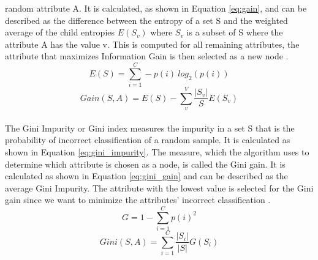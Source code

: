 random attribute A.  It is calculated, as shown in Equation \ref{eq:gain}, and 
can be described as the difference between the entropy of a set S and the 
weighted average of the child entropies $E(S_v)$ where $S_v$ is a subset of S 
where the attribute A has the value v. This is computed for all remaining 
attributes, the attribute that maximizes Information Gain is then selected as a 
new node \cite{RN165}.
\begin{equation}
 E(S) = \sum_{i=1}^C -p(i) \ log_2(p(i))
 \label{eq:entropy}
\end{equation}
\begin{equation}
 Gain(S, A) = E(S) - \sum_{v}^{V} \frac{|S_v|}{S} E(S_v)
 \label{eq:gain}
\end{equation}
\\
The Gini Impurity or Gini index measures the impurity in a set S that is the 
probability of incorrect classification of a random sample. It is calculated 
as shown in Equation \ref{eq:gini_impurity}. The measure, which the algorithm 
uses to determine which attribute is chosen as a node, is called the Gini gain. 
It is calculated as shown in Equation \ref{eq:gini_gain} and can be 
described as the average Gini Impurity. The attribute with the lowest value is 
selected for the Gini gain since we want to minimize the attributes' incorrect 
classification \cite{RN171}.
\begin{equation}
 G = 1 - \sum_{i=1}^C p(i)^2
 \label{eq:gini_impurity}
\end{equation}
\begin{equation}
 Gini(S, A) = \sum_{i=1}^C \frac{|S_i|}{|S|} G(S_i)
 \label{eq:gini_gain}
\end{equation}
\\
